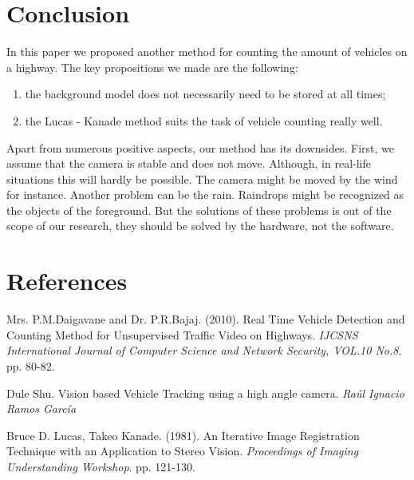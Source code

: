 \documentclass[12pt,a4paper,oneside,titlepage]{article}
\begin{document}
\section{Conclusion}


In this paper we proposed another method for counting the amount of vehicles on a highway.
The key propositions we made are the following:
\begin{enumerate}
	\item the background model does not necessarily need to be stored at all times;
	\item the Lucas - Kanade method \cite{lucaskanade} suits the task of vehicle counting really well. 
\end{enumerate}

Apart from numerous positive aspects, our method has its downsides.
First, we assume that the camera is stable and does not move.
Although, in real-life situations this will hardly be possible.
The camera might be moved by the wind for instance.
Another problem can be the rain.
Raindrops might be recognized as the objects of the foreground.
But the solutions of these problems is out of the scope of our research, they should be solved by the hardware, not the software.


\renewcommand{\refname}{}
\newpage
\section{References}
\begin{thebibliography}{99}
\vspace*{-1cm}

Mrs. P.M.Daigavane and Dr. P.R.Bajaj. 
(2010). 
Real Time Vehicle Detection and Counting Method for Unsupervised Traffic Video on Highways.
\textit{IJCSNS International Journal of Computer Science and Network Security, VOL.10 No.8}.
pp. 80-82.

Dule Shu.
Vision based Vehicle Tracking using a high angle camera.
\textit{Raúl Ignacio Ramos García}

Bruce D. Lucas, Takeo Kanade. 
(1981). 
An Iterative Image Registration Technique with an Application to Stereo Vision. 
\textit{Proceedings of Imaging Understanding Workshop}. 
pp. 121-130.

\end{thebibliography}
\end{document}

